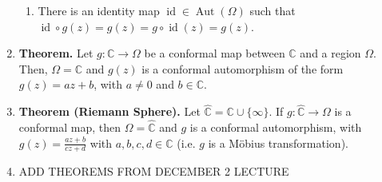 \documentclass[10pt]{article}
\theoremstyle{definition}
\theoremstyle{named}
\DeclareMathOperator{\Aut}{Aut}
\DeclareMathOperator{\id}{id}
\begin{document}
\begin{enumerate}
\begin{enumerate}
        \item There is an identity map $\id \in \Aut(\Omega)$ such that $\id \circ g(z) = g(z) = g \circ \id(z) = g(z)$. 
    \end{enumerate}
    \item \textbf{Theorem. } Let $g: \mathbb{C} \to \Omega$ be a conformal map between $\mathbb{C}$ and a region $\Omega$. Then, $\Omega = \mathbb{C}$ and $g(z)$ is a conformal automorphism of the form $g(z) = az+b$, with $a \neq 0$ and $b \in \mathbb{C}$. 
    \item \textbf{Theorem (Riemann Sphere). } Let $\hat{\mathbb{C}} = \mathbb{C} \cup \{\infty\}$. If $g: \hat{\mathbb{C}} \to \Omega$ is a conformal map, then $\Omega = \hat{\mathbb{C}}$ and $g$ is a conformal automorphism, with $g(z) = \frac{az+b}{cz+d}$ with $a,b,c,d \in \mathbb{C}$ (i.e. $g$ is a Möbius transformation). 
    \item ADD THEOREMS FROM DECEMBER 2 LECTURE
\end{enumerate}
\end{document}
